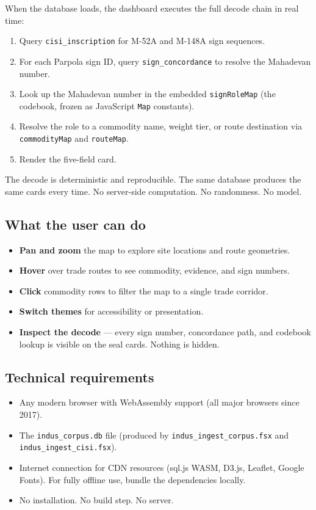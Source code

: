 When the database loads, the dashboard executes the full decode
chain in real time:

\begin{enumerate}[nosep]
\item Query \texttt{cisi\_inscription} for M-52A and M-148A sign
  sequences.
\item For each Parpola sign ID, query \texttt{sign\_concordance} to
  resolve the Mahadevan number.
\item Look up the Mahadevan number in the embedded
  \texttt{signRoleMap} (the codebook, frozen as JavaScript
  \texttt{Map} constants).
\item Resolve the role to a commodity name, weight tier, or route
  destination via \texttt{commodityMap} and \texttt{routeMap}.
\item Render the five-field card.
\end{enumerate}

\noindent
The decode is deterministic and reproducible. The same database
produces the same cards every time. No server-side computation.
No randomness. No model.

\subsection{What the user can do}

\begin{itemize}
\item \textbf{Pan and zoom} the map to explore site locations and
  route geometries.
\item \textbf{Hover} over trade routes to see commodity, evidence,
  and sign numbers.
\item \textbf{Click} commodity rows to filter the map to a single
  trade corridor.
\item \textbf{Switch themes} for accessibility or presentation.
\item \textbf{Inspect the decode} --- every sign number, concordance
  path, and codebook lookup is visible on the seal cards.
  Nothing is hidden.
\end{itemize}

\subsection{Technical requirements}

\begin{itemize}
\item Any modern browser with WebAssembly support (all major
  browsers since 2017).
\item The \texttt{indus\_corpus.db} file (produced by
  \texttt{indus\_ingest\_corpus.fsx} and
  \texttt{indus\_ingest\_cisi.fsx}).
\item Internet connection for CDN resources (sql.js WASM, D3.js,
  Leaflet, Google Fonts). For fully offline use, bundle the
  dependencies locally.
\item No installation. No build step. No server.
\end{itemize}

